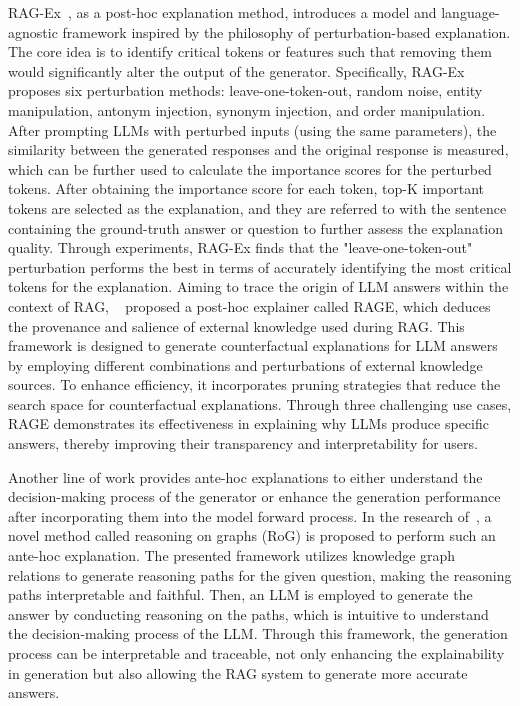 RAG-Ex~\cite{sudhi2024rag}, as a post-hoc explanation method, introduces a model and language-agnostic framework inspired by the philosophy of perturbation-based explanation. The core idea is to identify critical tokens or features such that removing them would significantly alter the output of the generator. Specifically, RAG-Ex proposes six perturbation methods: leave-one-token-out, random noise, entity manipulation, antonym injection, synonym injection, and order manipulation. After prompting LLMs with perturbed inputs (using the same parameters), the similarity between the generated responses and the original response is measured, which can be further used to calculate the importance scores for the perturbed tokens. After obtaining the importance score for each token, top-K important tokens are selected as the explanation, and they are referred to with the sentence containing the ground-truth answer or question to further assess the explanation quality. Through experiments, RAG-Ex finds that the "leave-one-token-out" perturbation performs the best in terms of accurately identifying the most critical tokens for the explanation. Aiming to trace the origin of LLM answers within the context of RAG, ~\citet{rorseth2024rage} proposed a post-hoc explainer called RAGE, which deduces the provenance and salience of external knowledge used during RAG. This framework is designed to generate counterfactual explanations for LLM answers by employing different combinations and perturbations of external knowledge sources. To enhance efficiency, it incorporates pruning strategies that reduce the search space for counterfactual explanations. Through three challenging use cases, RAGE demonstrates its effectiveness in explaining why LLMs produce specific answers, thereby improving their transparency and interpretability for users.


Another line of work provides ante-hoc explanations to either understand the decision-making process of the generator or enhance the generation performance after incorporating them into the model forward process. In the research of~\cite{luo2024rog}, a novel method called reasoning on graphs (RoG) is proposed to perform such an ante-hoc explanation. The presented framework utilizes knowledge graph relations to generate reasoning paths for the given question, making the reasoning paths interpretable and faithful. Then, an LLM is employed to generate the answer by conducting reasoning on the paths, which is intuitive to understand the decision-making process of the LLM. Through this framework, the generation process can be interpretable and traceable, not only enhancing the explainability in generation but also allowing the RAG system to generate more accurate answers.

